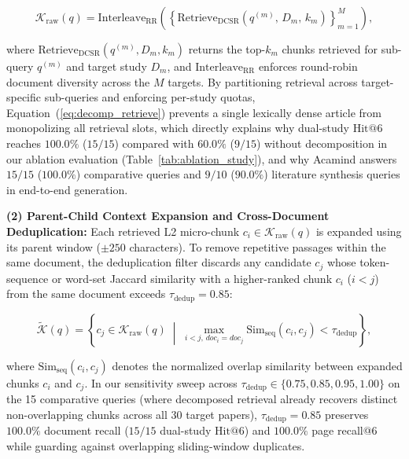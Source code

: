 \documentclass[10pt]{SPIIRAS_Proceedings}
\begin{document}
\begin{equation}
\mathcal{K}_{\mathrm{raw}}(q) = \mathrm{Interleave}_{\mathrm{RR}}\left(\left\{\mathrm{Retrieve}_{\mathrm{DCSR}}\left(q^{(m)}, \, D_m, \, k_m\right)\right\}_{m=1}^{M}\right),
\label{eq:decomp_retrieve}
\end{equation}

\noindent where $\mathrm{Retrieve}_{\mathrm{DCSR}}(q^{(m)}, D_m, k_m)$ returns the top-$k_m$ chunks retrieved for sub-query $q^{(m)}$ and target study $D_m$, and $\mathrm{Interleave}_{\mathrm{RR}}$ enforces round-robin document diversity across the $M$ targets. By partitioning retrieval across target-specific sub-queries and enforcing per-study quotas, Equation~(\ref{eq:decomp_retrieve}) prevents a single lexically dense article from monopolizing all retrieval slots, which directly explains why dual-study $\mathrm{Hit@6}$ reaches $100.0\%$ ($15/15$) compared with $60.0\%$ ($9/15$) without decomposition in our ablation evaluation (Table~\ref{tab:ablation_study}), and why Acamind answers $15/15$ ($100.0\%$) comparative queries and $9/10$ ($90.0\%$) literature synthesis queries in end-to-end generation.

\textbf{(2) Parent-Child Context Expansion and Cross-Document Deduplication:} Each retrieved L2 micro-chunk $c_i \in \mathcal{K}_{\mathrm{raw}}(q)$ is expanded using its parent window ($\pm 250$ characters). To remove repetitive passages within the same document, the deduplication filter discards any candidate $c_j$ whose token-sequence or word-set Jaccard similarity with a higher-ranked chunk $c_i$ ($i < j$) from the same document exceeds $\tau_{\mathrm{dedup}} = 0.85$:

\begin{equation}
\widetilde{\mathcal{K}}(q) = \left\{ c_j \in \mathcal{K}_{\mathrm{raw}}(q) \;\middle|\; \max_{i < j, \, doc_i = doc_j} \mathrm{Sim}_{\mathrm{seq}}(c_i, c_j) < \tau_{\mathrm{dedup}} \right\},
\label{eq:cross_dedup}
\end{equation}

\noindent where $\mathrm{Sim}_{\mathrm{seq}}(c_i, c_j)$ denotes the normalized overlap similarity between expanded chunks $c_i$ and $c_j$. In our sensitivity sweep across $\tau_{\mathrm{dedup}} \in \{0.75, 0.85, 0.95, 1.00\}$ on the 15 comparative queries (where decomposed retrieval already recovers distinct non-overlapping chunks across all 30 target papers), $\tau_{\mathrm{dedup}} = 0.85$ preserves $100.0\%$ document recall ($15/15$ dual-study $\mathrm{Hit@6}$) and $100.0\%$ page recall@6 while guarding against overlapping sliding-window duplicates.
\end{document}
